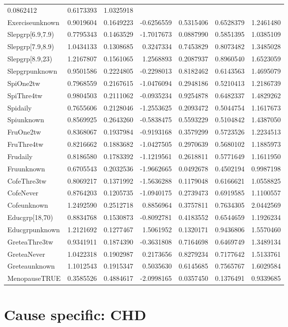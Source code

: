 \documentclass[]{article}
\begin{document}
\begin{longtable}[]{@{}lrrrrrr@{}}
0.0862412 & 0.6173393 & 1.0325918\tabularnewline
Exerciseunknown & 0.9019604 & 0.1649223 & -0.6256559 & 0.5315406 &
0.6528379 & 1.2461480\tabularnewline
Slepgrp{[}6.9,7.9) & 0.7795343 & 0.1463529 & -1.7017673 & 0.0887990 &
0.5851395 & 1.0385109\tabularnewline
Slepgrp{[}7.9,8.9) & 1.0434133 & 0.1308685 & 0.3247334 & 0.7453829 &
0.8073482 & 1.3485028\tabularnewline
Slepgrp{[}8.9,23) & 1.2167807 & 0.1561065 & 1.2568893 & 0.2087937 &
0.8960540 & 1.6523059\tabularnewline
Slepgrpunknown & 0.9501586 & 0.2224805 & -0.2298013 & 0.8182462 &
0.6143563 & 1.4695079\tabularnewline
SpiOne2tw & 0.7968559 & 0.2167615 & -1.0476094 & 0.2948186 & 0.5210413 &
1.2186739\tabularnewline
SpiThre4tw & 0.9804503 & 0.2111062 & -0.0935234 & 0.9254878 & 0.6482337
& 1.4829262\tabularnewline
Spidaily & 0.7655606 & 0.2128046 & -1.2553625 & 0.2093472 & 0.5044754 &
1.1617673\tabularnewline
Spiunknown & 0.8569925 & 0.2643260 & -0.5838475 & 0.5593229 & 0.5104842
& 1.4387050\tabularnewline
FruOne2tw & 0.8368067 & 0.1937984 & -0.9193168 & 0.3579299 & 0.5723526 &
1.2234513\tabularnewline
FruThre4tw & 0.8216662 & 0.1883682 & -1.0427505 & 0.2970639 & 0.5680102
& 1.1885973\tabularnewline
Frudaily & 0.8186580 & 0.1783392 & -1.1219561 & 0.2618811 & 0.5771649 &
1.1611950\tabularnewline
Fruunknown & 0.6705543 & 0.2032536 & -1.9662665 & 0.0492678 & 0.4502194
& 0.9987198\tabularnewline
CofeThre3tw & 0.8069217 & 0.1371992 & -1.5636288 & 0.1179048 & 0.6166621
& 1.0558825\tabularnewline
CofeNever & 0.8764203 & 0.1205735 & -1.0940175 & 0.2739473 & 0.6919585 &
1.1100557\tabularnewline
Cofeunknown & 1.2492590 & 0.2512718 & 0.8856964 & 0.3757811 & 0.7634305
& 2.0442569\tabularnewline
Educgrp{[}18,70) & 0.8834768 & 0.1530873 & -0.8092781 & 0.4183552 &
0.6544659 & 1.1926234\tabularnewline
Educgrpunknown & 1.2121692 & 0.1277467 & 1.5061952 & 0.1320171 &
0.9436806 & 1.5570460\tabularnewline
GreteaThre3tw & 0.9341911 & 0.1874390 & -0.3631808 & 0.7164698 &
0.6469749 & 1.3489134\tabularnewline
GreteaNever & 1.0422318 & 0.1902987 & 0.2173656 & 0.8279234 & 0.7177642
& 1.5133761\tabularnewline
Greteaunknown & 1.1012543 & 0.1915347 & 0.5035630 & 0.6145685 &
0.7565767 & 1.6029584\tabularnewline
MenopauseTRUE & 0.3585526 & 0.4884617 & -2.0998165 & 0.0357450 &
0.1376491 & 0.9339685\tabularnewline
\bottomrule
\end{longtable}

\hypertarget{cause-specific-chd}{%
\section{Cause specific: CHD}\label{cause-specific-chd}}
\end{document}

